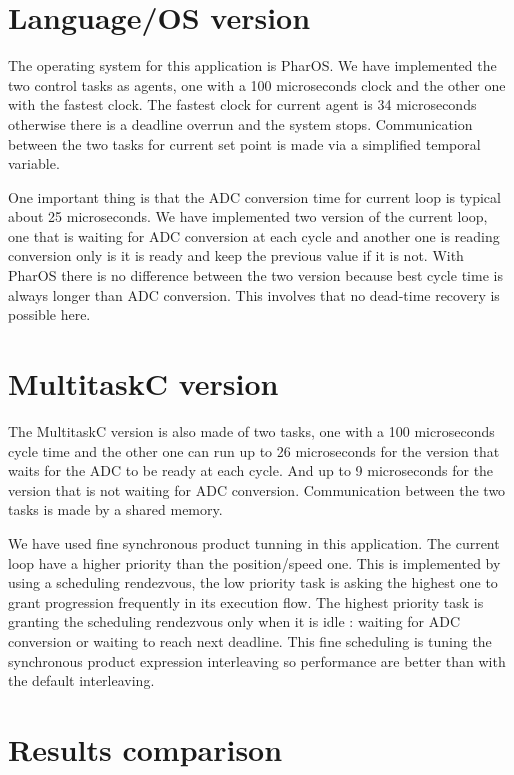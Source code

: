 \documentclass[10pt]{report}
\begin{document}
\section{Language/OS version}

The operating system for this application is PharOS. We have implemented the two control tasks as agents,
one with a 100 microseconds clock and the other one with the fastest clock. The fastest clock for current
agent is 34 microseconds otherwise there is a deadline overrun and the system stops. Communication
between the two tasks for current set point is made via a simplified temporal variable.

One important thing is that the ADC conversion time for current loop is typical about 25 microseconds. We
have implemented two version of the current loop, one that is waiting for ADC conversion at each cycle
and another one is reading conversion only is it is ready and keep the previous value if it is not. With
PharOS there is no difference between the two version because best cycle time is always longer than
ADC conversion. This involves that no dead-time recovery is possible here.

\section{MultitaskC version}

The MultitaskC version is also made of two tasks, one with a 100 microseconds cycle time and the other one
can run up to 26 microseconds for the version that waits for the ADC to be ready at each cycle. And up
to 9 microseconds for the version that is not waiting for ADC conversion. Communication between the two
tasks is made by a shared memory.

We have used fine synchronous product tunning in this application. The current loop have a higher priority
than the position/speed one. This is implemented by using a scheduling rendezvous, the low priority task
is asking the highest one to grant progression frequently in its execution flow. The highest priority
task is granting the scheduling rendezvous only when it is idle : waiting for ADC conversion or waiting
to reach next deadline. This fine scheduling is tuning the synchronous product expression interleaving
so performance are better than with the default interleaving.

\section{Results comparison}
\end{document}
